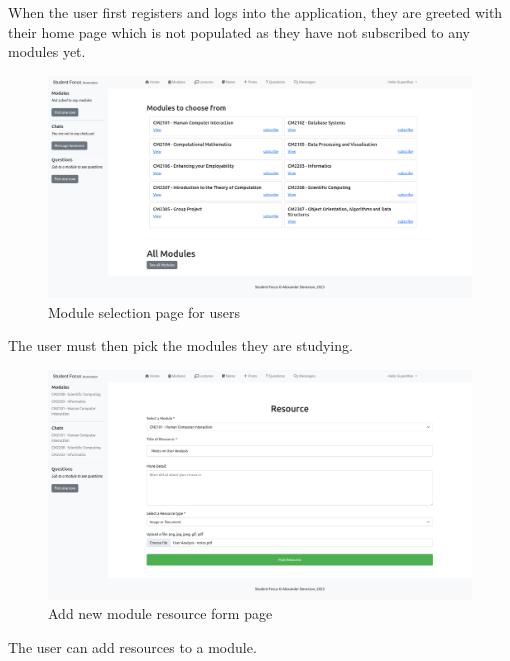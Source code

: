 When the user first registers and logs into the application, they are greeted with their home page which is not populated as they have not subscribed to any modules yet.

\begin{figure}[H]
\centering
\includegraphics[scale=0.20]{images/application/5 - module_selection.png}
\caption{Module selection page for users}
\label{fig:figure2}
\end{figure}

The user must then pick the modules they are studying.

\begin{figure}[H]
\centering
\includegraphics[scale=0.20]{images/application/14 - student resource.png}
\caption{Add new module resource form page}
\label{fig:figure2}
\end{figure}

The user can add resources to a module.

